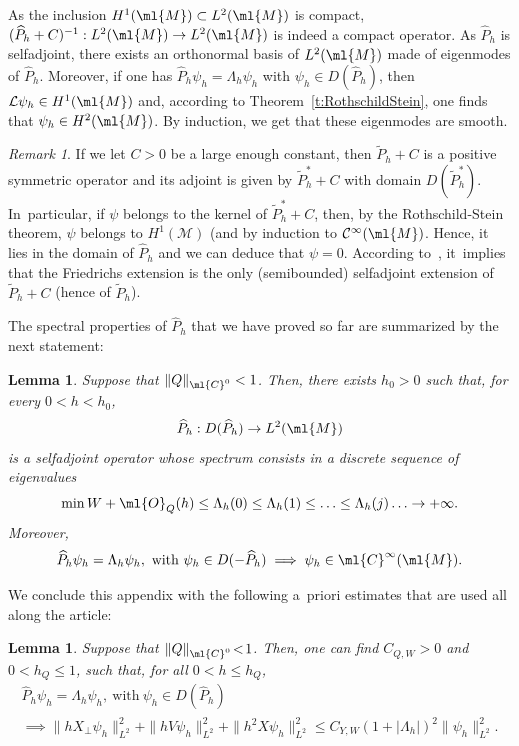 \documentclass[JEP,XML,SOM,Unicode, NoEqCountersInSection,published]{cedram}
\theoremstyle{plain}
\newtheorem{lemm}[theo]{Lemma}
\theoremstyle{definition}
\theoremstyle{remark}
\newtheorem{rema}[theo]{Remark}
\begin{document}
As the inclusion $H^1(\ml{M})\subset L^2(\ml{M})$ is compact, $(\widehat{P}_h+C)^{-1}:L^2(\ml{M})\to L^2(\ml{M})$ is indeed a compact operator. As $\widehat{P}_h$ is selfadjoint, there exists an orthonormal basis of $L^2(\ml{M})$ made of eigenmodes of $\widehat{P}_h$. Moreover, if one has $\widehat{P}_h\psi_h=\Lambda_h\psi_h$ with $\psi_h\in D(\widehat{P}_h)$, then $\mathcal{L}\psi_h\in H^1(\ml{M})$ and, according to Theorem~\ref{t:RothschildStein}, one finds that $\psi_h\in H^2(\ml{M})$. By induction, we get that these eigenmodes are smooth.

\begin{rema} If we let $C>0$ be a large enough constant, then $\tilde{P}_h+C$ is a positive symmetric operator and its adjoint is given by $\tilde{P}_h^*+C$ with domain $D(\tilde{P}_h^*)$. In~particular, if $\psi$ belongs to the kernel of $\tilde{P}_h^*+C$, then, by the Rothschild-Stein theorem, $\psi$ belongs to $H^1(\mathcal{M})$ (and by induction to $\mathcal{C}^{\infty}(\ml{M})$. Hence, it lies in the domain of $\widehat{P}_h$ and we can deduce that $\psi=0$. According to~\cite[Th.\,X.26]{ReedSimon75}, it~implies that the Friedrichs extension is the only (semibounded) selfadjoint extension of $\tilde{P}_h+C$ (hence of $\tilde{P}_h$).
\end{rema}

The spectral properties of $\widehat{P}_h$ that we have proved so far are summarized by the next statement:

\begin{lemm}\label{l:spectrum} Suppose that $\|Q\|_{\ml{C}^0}<1$. Then, there exists $h_0>0$ such that, for every $0<h<h_0$,
\[
\widehat{P}_h:D(\widehat{P}_h)\to L^2(\ml{M})
\]
is a selfadjoint operator whose spectrum consists in a discrete sequence of eigenvalues
\[
\min W+\ml{O}_Q(h)\leq \Lambda_h(0)\leq\Lambda_h(1)\leq\ldots\leq \Lambda_h(j)\ldots\to +\infty.
\]
Moreover,
\[
\widehat{P}_h\psi_h=\Lambda_h\psi_h,\ \text{with}\ \psi_h\in D(-\widehat{P}_h)\implies \psi_h\in \ml{C}^\infty(\ml{M}).
\]
\end{lemm}

We conclude this appendix with the following a~priori estimates that are used all along the article:

\begin{lemm}\label{l:apriori-estimate} Suppose that $\|Q\|_{\ml{C}^0}\!<\!1$. Then, one can find $C_{Q,W}\!>\!0$ and $0\!<\!h_Q\!\leq\! 1$, such that, for all $0<h\leq h_Q$,
\begin{multline*}
\widehat{P}_h\psi_h=\Lambda_h\psi_h,\ \text{with}\ \psi_h\in D(\widehat{P}_h)\\
\implies \|hX_\perp\psi_h\|_{L^2}^2+\|hV\psi_h\|_{L^2}^2+\|h^2X\psi_h\|_{L^2}^2\leq C_{Y,W}(1+|\Lambda_h|)^2\|\psi_h\|_{L^2}^2.
\end{multline*}
\end{lemm}
\end{document}
